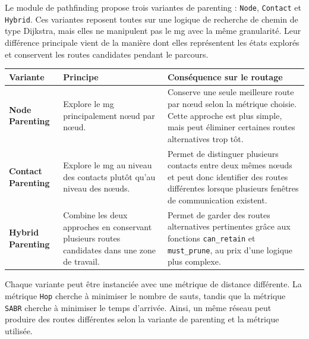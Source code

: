 \documentclass{article}
\begin{document}
Le module de pathfinding propose trois variantes de parenting : \texttt{Node}, \texttt{Contact} et \texttt{Hybrid}. Ces variantes reposent toutes sur une logique de recherche de chemin de type Dijkstra, mais elles ne manipulent pas le \gls{mg} avec la même granularité. Leur différence principale vient de la manière dont elles représentent les états explorés et conservent les routes candidates pendant le parcours.

\begin{center}
\footnotesize
\setlength{\tabcolsep}{4pt}
\renewcommand{\arraystretch}{1.2}

\begin{tabular}{|p{}|p{}|p{}|}
\hline
\textbf{Variante} & \textbf{Principe} & \textbf{Conséquence sur le routage} \\
\hline

\textbf{Node Parenting}
& Explore le \gls{mg} principalement nœud par nœud.
& Conserve une seule meilleure route par nœud selon la métrique choisie. Cette approche est plus simple, mais peut éliminer certaines routes alternatives trop tôt. \\
\hline

\textbf{Contact Parenting}
& Explore le \gls{mg} au niveau des contacts plutôt qu'au niveau des nœuds.
& Permet de distinguer plusieurs contacts entre deux mêmes nœuds et peut donc identifier des routes différentes lorsque plusieurs fenêtres de communication existent. \\
\hline

\textbf{Hybrid Parenting}
& Combine les deux approches en conservant plusieurs routes candidates dans une zone de travail.
& Permet de garder des routes alternatives pertinentes grâce aux fonctions \texttt{can\_retain} et \texttt{must\_prune}, au prix d'une logique plus complexe. \\
\hline

\end{tabular}

\label{tab:parenting-comparison}
\end{center}

Chaque variante peut être instanciée avec une métrique de distance différente. La métrique \texttt{Hop} cherche à minimiser le nombre de sauts, tandis que la métrique \texttt{SABR} cherche à minimiser le temps d'arrivée. Ainsi, un même réseau peut produire des routes différentes selon la variante de parenting et la métrique utilisée.
\end{document}
